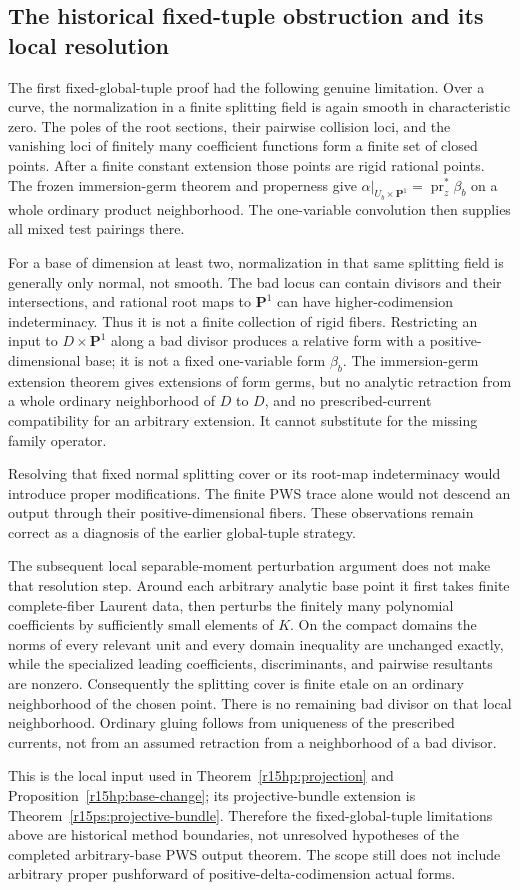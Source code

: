 \subsection{The historical fixed-tuple obstruction and its local resolution}

The first fixed-global-tuple proof had the following genuine
limitation. Over a curve, the normalization in a finite splitting field is again
smooth in characteristic zero. The poles of the root sections, their
pairwise collision loci, and the vanishing loci of finitely many
coefficient functions form a finite set of closed points. After a
finite constant extension those points are rigid rational points.
The frozen immersion-germ theorem and properness give
$\alpha|_{U_b\times\mathbf P^1}=\operatorname{pr}_z^*\beta_b$ on a
whole ordinary product neighborhood. The one-variable convolution
then supplies all mixed test pairings there.

For a base of dimension at least two, normalization in that same
splitting field is generally only normal, not smooth. The bad locus
can contain divisors and their intersections, and rational root maps
to $\mathbf P^1$ can have higher-codimension indeterminacy. Thus it
is not a finite collection of rigid fibers. Restricting an input to
$D\times\mathbf P^1$ along a bad divisor produces a relative form
with a positive-dimensional base; it is not a fixed one-variable
form $\beta_b$. The immersion-germ extension theorem gives
extensions of form germs, but no analytic retraction from a whole
ordinary neighborhood of $D$ to $D$, and no prescribed-current
compatibility for an arbitrary extension. It cannot substitute for
the missing family operator.

Resolving that fixed normal splitting cover or its root-map
indeterminacy would introduce proper modifications. The finite
PWS trace alone would not descend an output through their
positive-dimensional fibers. These observations remain correct
as a diagnosis of the earlier global-tuple strategy.

The subsequent local separable-moment perturbation argument
does not make that resolution step. Around each arbitrary
analytic base point it first takes finite complete-fiber
Laurent data, then perturbs the finitely many polynomial
coefficients by sufficiently small elements of $K$.
On the compact domains the norms of every relevant unit
and every domain inequality are unchanged exactly, while
the specialized leading coefficients, discriminants, and
pairwise resultants are nonzero. Consequently the splitting
cover is finite etale on an ordinary neighborhood of the
chosen point. There is no remaining bad divisor on that
local neighborhood. Ordinary gluing follows from uniqueness
of the prescribed currents, not from an assumed retraction
from a neighborhood of a bad divisor.

This is the local input used in
Theorem~\ref{r15hp:projection} and
Proposition~\ref{r15hp:base-change}; its projective-bundle
extension is Theorem~\ref{r15ps:projective-bundle}.
Therefore the fixed-global-tuple limitations above are
historical method boundaries, not unresolved hypotheses
of the completed arbitrary-base PWS output theorem.
The scope still does not include arbitrary proper
pushforward of positive-delta-codimension actual forms.

